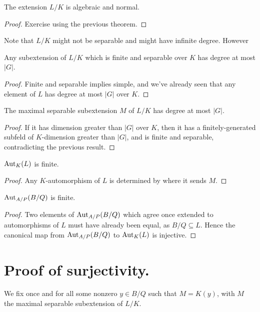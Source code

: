 \begin{corollary} The extension $L/K$ is algebraic and normal.
\end{corollary}
\begin{proof} 
  Exercise using the previous theorem.
\end{proof}

Note that $L/K$ might not be separable and might have infinite degree. However

\begin{corollary} Any subextension of $L/K$ which is finite and separable over $K$
  has degree at most $|G|$.
\end{corollary}
\begin{proof}
  Finite and separable implies simple, and we've already seen that any
  element of $L$ has degree at most $|G|$ over $K$.
\end{proof}

\begin{corollary} The maximal separable subextension $M$ of $L/K$ has degree at most $|G|$.
\end{corollary}
\begin{proof} If it has dimension greater than $|G|$ over $K$, then it has a finitely-generated
  subfeld of $K$-dimension greater than $|G|$, and is finite and separable, contradicting
  the previous result.
\end{proof}

\begin{corollary} $\operatorname{Aut}_K(L)$ is finite.
\end{corollary}
\begin{proof} Any $K$-automorphism of $L$ is determined by where it sends $M$.
\end{proof}

\begin{corollary} $\operatorname{Aut}_{A/P}(B/Q)$ is finite.
\end{corollary}
\begin{proof}
  Two elements of $\operatorname{Aut}_{A/P}(B/Q)$ which agree once extended to automorphisms of $L$
  must have already been equal, as $B/Q\subseteq L$. Hence the canonical map
  from $\operatorname{Aut}_{A/P}(B/Q)$ to $\operatorname{Aut}_K(L)$ is injective.
\end{proof}

\section{Proof of surjectivity.}

\begin{definition} We fix once and for all some nonzero $y\in B/Q$ such that $M=K(y)$,
  with $M$ the maximal separable subextension of $L/K$.
\end{definition}

